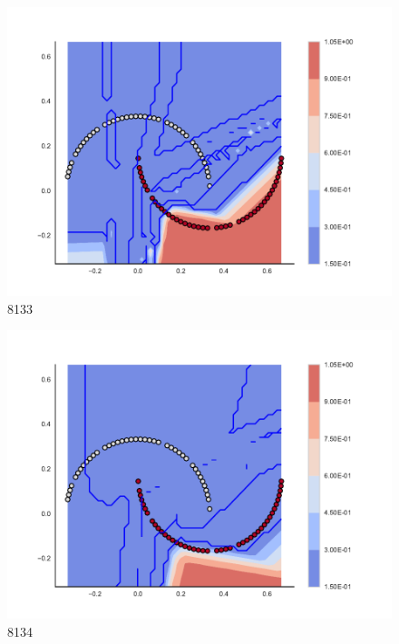 \begin{subfigure}[b]{0.09\textwidth}
    \includegraphics[clip, trim=2.35cm 1.75cm 4.5cm 0cm,width=\textwidth]{img/convergence/8133.pdf}
    \caption{8133}
    \label{fig:convergence_8133}
\end{subfigure}
%
\begin{subfigure}[b]{0.09\textwidth}
    \includegraphics[clip, trim=2.35cm 1.75cm 4.5cm 0cm,width=\textwidth]{img/convergence/8134.pdf}
    \caption{8134}
    \label{fig:convergence_8134}
\end{subfigure}
%
